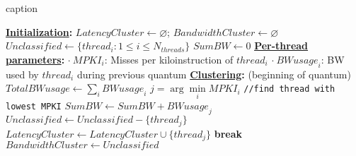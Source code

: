 \begin{algorithm}[h]
\caption{caption}
\label{algo:algo}
\begin{algorithmic}
\footnotesize{
\STATE \textbf{\underline{Initialization}:}
\STATE $\mathit{LatencyCluster} \leftarrow \varnothing$; $\mathit{BandwidthCluster} \leftarrow \varnothing$
\STATE $\mathit{Unclassified} \leftarrow \{\mathit{thread}_i: 1 \leq i \leq N_{\mathit{threads}}\}$
\STATE $\mathit{SumBW} \leftarrow 0$
\STATE
\STATE \textbf{\underline{Per-thread parameters}:}
\STATE $\cdot\:\mathit{MPKI}_i$: Misses per kiloinstruction of $\mathit{thread}_i$
\STATE $\cdot\:\mathit{BWusage}_i$: BW used by $\mathit{thread}_i$ during previous quantum
\STATE
\STATE \textbf{\underline{Clustering}:} (beginning of quantum)
\STATE $\mathit{TotalBWusage} \leftarrow \sum_{i}{\mathit{BWusage}}_i$
\STATE $j = \arg\min\limits_{i} {\mathit{MPKI}_i}$ \texttt{//find thread with lowest MPKI} 
\STATE $\mathit{SumBW} \leftarrow \mathit{SumBW} + \mathit{BWusage}_j$ 
\STATE $\mathit{Unclassified} \leftarrow \mathit{Unclassified} - \{\mathit{thread}_j\}$
\STATE $\mathit{LatencyCluster} \leftarrow \mathit{LatencyCluster} \cup \{\mathit{thread}_j\}$
\ELSE 
\STATE \textbf{break}
\ENDIF
\ENDWHILE
\STATE $\mathit{BandwidthCluster} \leftarrow \mathit{Unclassified}$
}
\end{algorithmic}
\end{algorithm}


